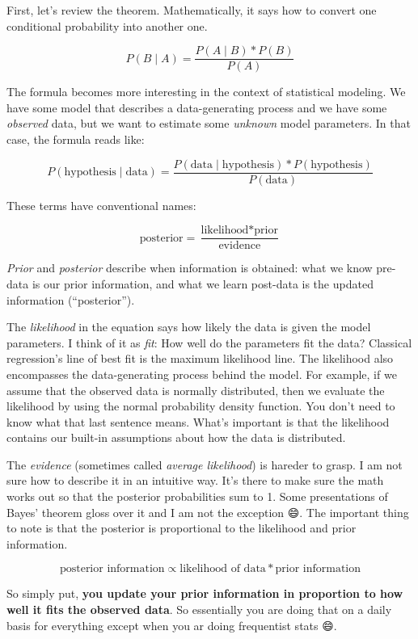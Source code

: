 \documentclass[
  12pt,
]{book}
\begin{document}
First, let's review the theorem. Mathematically, it says how to convert one conditional probability into another one.

\[ P(B \mid A) = \frac{ P(A \mid B) * P(B)}{P(A)} \]

The formula becomes more interesting in the context of statistical modeling. We
have some model that describes a data-generating process and we have some
\emph{observed} data, but we want to estimate some \emph{unknown} model parameters.
In that case, the formula reads like:

\[ P(\text{hypothesis} \mid \text{data}) = \frac{ P(\text{data} \mid \text{hypothesis}) * P(\text{hypothesis})}{P(\text{data})} \]

These terms have conventional names:

\[ \text{posterior} = \frac{ \text{likelihood} * \text{prior}}{\text{evidence}} \]

\emph{Prior} and \emph{posterior} describe when information is obtained: what we know pre-data is our
prior information, and what we learn post-data is the updated information
(``posterior'').

The \emph{likelihood} in the equation says how likely the data is given the model
parameters. I think of it as \emph{fit}: How well do the parameters fit the data?
Classical regression's line of best fit is the maximum likelihood line. The
likelihood also encompasses the data-generating process behind the model. For
example, if we assume that the observed data is normally distributed, then we
evaluate the likelihood by using the normal probability density function. You
don't need to know what that last sentence means. What's important is that the
likelihood contains our built-in assumptions about how the data is distributed.

The \emph{evidence} (sometimes called \emph{average likelihood}) is hareder to grasp. I am not sure how to describe it in an intuitive way.
It's there to make sure the math works out so that the posterior probabilities sum to 1.
Some presentations of Bayes' theorem gloss over it and I am not the exception 😄.
The important thing to note is that the posterior is proportional to the
likelihood and prior information.

\[ 
\text{posterior information} \propto 
  \text{likelihood of data} * \text{prior information} 
\]

So simply put, \textbf{you update your prior information in proportion to how well it fits
the observed data}. So essentially you are doing that on a daily basis for everything except when you ar doing frequentist stats 😄.
\end{document}
